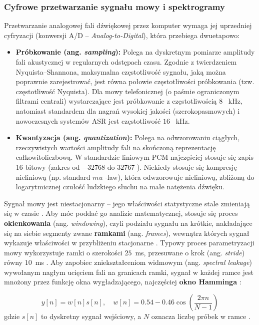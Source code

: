 \subsubsection{Cyfrowe przetwarzanie sygnału mowy i spektrogramy}
Przetwarzanie analogowej fali dźwiękowej przez komputer wymaga jej uprzedniej cyfryzacji (konwersji A/D -- \textit{Analog-to-Digital}), która przebiega dwuetapowo:
\begin{itemize}
\item \textbf{Próbkowanie (ang. \textit{sampling}):} Polega na dyskretnym pomiarze amplitudy fali akustycznej w regularnych odstępach czasu. Zgodnie z twierdzeniem Nyquista--Shannona, maksymalna częstotliwość sygnału, jaką można poprawnie zarejestrować, jest równa połowie częstotliwości próbkowania (tzw. częstotliwość Nyquista). Dla mowy telefonicznej (o paśmie ograniczonym filtrami centrali) wystarczające jest próbkowanie z częstotliwością  $8$ ~kHz, natomiast standardem dla nagrań wysokiej jakości (szerokopasmowych) i nowoczesnych systemów ASR jest częstotliwość  $16$ ~kHz.

\item \textbf{Kwantyzacja (ang. \textit{quantization}):} Polega na odwzorowaniu ciągłych, rzeczywistych wartości amplitudy fali na skończoną reprezentację całkowitoliczbową. W standardzie liniowym PCM najczęściej stosuje się zapis 16-bitowy (zakres od  $-32768$  do  $32767$ ). Niekiedy stosuje się kompresję nieliniową (np. standard  $mu$ -law), która odwzorowuje nieliniową, zbliżoną do logarytmicznej czułość ludzkiego słuchu na małe natężenia dźwięku.
\end{itemize}
Sygnał mowy jest niestacjonarny -- jego właściwości statystyczne stale zmieniają się w czasie \cite[s.~349]{jurafsky2026}. Aby móc poddać go analizie matematycznej, stosuje się proces \textbf{okienkowania} (ang. \textit{windowing}), czyli podziału sygnału na krótkie, nakładające się na siebie segmenty zwane \textbf{ramkami} (ang. \textit{frames}), wewnątrz których sygnał wykazuje właściwości w przybliżeniu stacjonarne \cite[s.~349]{jurafsky2026}. Typowy proces parametryzacji mowy wykorzystuje ramki o szerokości $25$~ms, przesuwane o krok (ang. \textit{stride}) równy $10$~ms \cite[s.~350]{jurafsky2026}. Aby zapobiec zniekształceniom widmowym (ang. \textit{spectral leakage}) wywołanym nagłym ucięciem fali na granicach ramki, sygnał w każdej ramce jest mnożony przez funkcję okna wygładzającego, najczęściej \textbf{okno Hamminga} \cite[s.~350]{jurafsky2026}:

\begin{equation}
    y[n] = w[n] s[n], \quad w[n] = 0.54 - 0.46 \cos\left(\frac{2\pi n}{N-1}\right)
\end{equation}
gdzie $s[n]$ to dyskretny sygnał wejściowy, a $N$ oznacza liczbę próbek w ramce \cite[s.~350]{jurafsky2026}.

